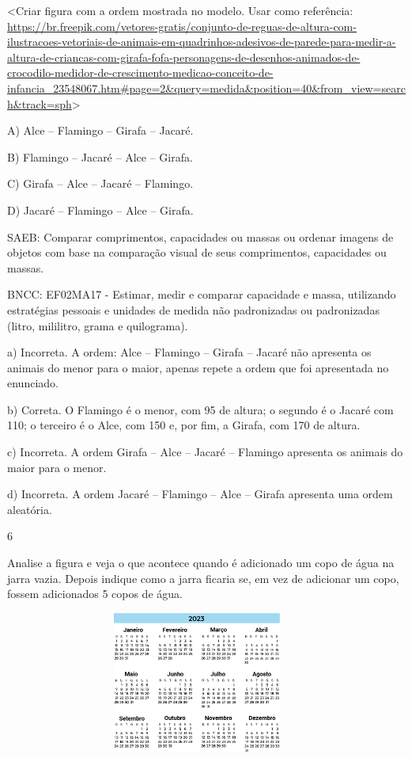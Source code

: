 \begin{escolha}
\begin{escolha}
{{{{{{{{\textless{}Criar figura com a ordem mostrada no modelo. Usar como
referência:
\url{https://br.freepik.com/vetores-gratis/conjunto-de-reguas-de-altura-com-ilustracoes-vetoriais-de-animais-em-quadrinhos-adesivos-de-parede-para-medir-a-altura-de-criancas-com-girafa-fofa-personagens-de-desenhos-animados-de-crocodilo-medidor-de-crescimento-medicao-conceito-de-infancia_23548067.htm\#page=2\&query=medida\&position=40\&from_view=search\&track=sph}\textgreater{}

A) Alce -- Flamingo -- Girafa -- Jacaré.

B) Flamingo -- Jacaré -- Alce -- Girafa.

C) Girafa -- Alce -- Jacaré -- Flamingo.

D) Jacaré -- Flamingo -- Alce -- Girafa.

SAEB: Comparar comprimentos, capacidades ou massas ou ordenar
imagens de objetos com base na comparação visual de seus comprimentos,
capacidades ou massas.

BNCC: EF02MA17 - Estimar, medir e comparar capacidade
e massa, utilizando estratégias pessoais e unidades de medida não
padronizadas ou padronizadas (litro, mililitro, grama e quilograma).

a) Incorreta. A ordem: Alce -- Flamingo -- Girafa -- Jacaré não
apresenta os animais do menor para o maior, apenas repete a ordem que
foi apresentada no enunciado.

b) Correta. O Flamingo é o menor, com 95 de altura; o segundo é o Jacaré
com 110; o terceiro é o Alce, com 150 e, por fim, a Girafa, com 170 de
altura.

c) Incorreta. A ordem Girafa -- Alce -- Jacaré -- Flamingo apresenta
os animais do maior para o menor.

d) Incorreta. A ordem Jacaré -- Flamingo -- Alce -- Girafa apresenta
uma ordem aleatória.

\num{6}

Analise a figura e veja o que acontece quando é adicionado um copo de
água na jarra vazia. Depois indique como a jarra ficaria se, em vez de
adicionar um copo, fossem adicionados 5 copos de água.

\includegraphics[width=5.00000in,height=1.82640in]{media/image144.png}

}}}}}}}}
\end{escolha}
\end{escolha}
